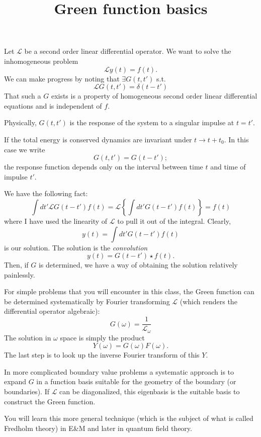 \documentclass{article}
\title{Green function basics}
\theoremstyle{definition}
\theoremstyle{remark}
\theoremstyle{remark}
\begin{document}
\maketitle

Let $\mathcal L$ be a second order linear differential operator. We want to solve the inhomogeneous problem
$$
\mathcal L y(t) = f(t).
$$
We can make progress by noting that $\exists G(t, t')$ s.t.
$$
\mathcal L G(t, t') = \delta(t-t')
$$
That such a $G$ exists is a property of homogeneous second order linear differential equations and is independent of $f$. 

\begin{tcolorbox}
	Physically, $G(t,t')$ is the response of the system to a singular impulse at $t=t'$.

If the total energy is conserved dynamics are invariant under $t\to t+t_0$. In this case we write
$$
G(t,t') = G(t-t');
$$ 
the response function depends only on the interval between time $t$ and time of impulse $t'$.
\end{tcolorbox}
We have the following fact:
$$
\int dt' \mathcal L G(t-t') f(t)  = \mathcal L \left\{\int dt' G(t-t')f(t)\right\} = f(t)
$$
where I have used the linearity of $\mathcal L$ to pull it out of the integral. Clearly, 
$$
y(t) = \int dt' G(t-t')f(t)
$$
is our solution. The solution is the \emph{convolution}
$$
y(t) = G(t-t')\star f(t).
$$
Then, if $G$ is determined, we have a way of obtaining the solution relatively painlessly. 

For simple problems that you will encounter in this class, the Green function can be determined systematically by Fourier transforming $\mathcal L$ (which renders the differential operator algebraic):
$$
 G(\omega) = \frac{1}{\mathcal L_\omega}
$$ 
The solution in $\omega$ space is simply the product
$$
Y(\omega) = G(\omega)F(\omega).
$$
The last step is to look up the inverse Fourier transform of this $Y$.

\begin{tcolorbox}
	In more complicated boundary value problems a systematic approach is to expand $G$ in a function basis suitable for the geometry of the boundary (or boundaries). If $\mathcal L$ can be diagonalized, this eigenbasis is the suitable basis to construct the Green function. 

	You will learn this more general technique (which is the subject of what is called Fredholm theory) in E\&M and later in quantum field theory.
\end{tcolorbox}
\end{document}
